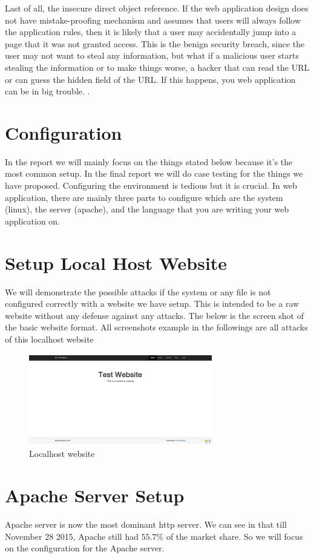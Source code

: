 \documentclass[conference]{IEEEtran}
\begin{document}
Last of all, the insecure direct object reference. If the web application design does not have mistake-proofing mechanism and assumes that users will always follow the application rules, 
then it is likely that a user may accidentally jump into a page that it was not granted access. This is the benign security breach, since the user may not want to steal any information, 
but what if a malicious user starts stealing the information or to make things worse, a hacker that can read the URL or can guess the hidden field of the URL\cite{Michael}. 
If this happens, you web application can be in big trouble.  \cite{Test}.

\section{Configuration}
In the report we will mainly focus on the things stated below
because it's the most common setup. In the final report we will do case testing for the things we have proposed.
Configuring the environment is tedious but it is crucial. In web application, there are mainly three parts to configure
which are the system (linux), the server (apache), and the language that you are writing your web application on.
\section{Setup Local Host Website}
We will demonstrate the possible attacks if the system or any file is not configured correctly with a website we have setup. This is intended to be a raw website without any defense against any attacks. The below is the screen shot of the basic website format. All screenshots example in the followings are all attacks of this localhost website
\begin{figure}[h]
\includegraphics[width=8cm, height=4cm]{yii}
\centering
\caption{Localhost website}
\end{figure}
\section{Apache Server Setup}
Apache server is now the most dominant http server. We can see in \cite{ApachePopularity} that till November 28 2015, Apache still had $55.7\%$ of the market share. So we will focus on the configuration for the Apache server.
\end{document}
